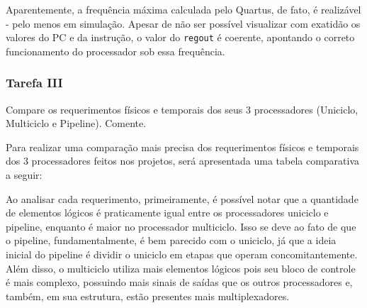 \documentclass[a4paper,12pt]{article}
\newcommand{\cod}[1]{\texttt{#1}}
\begin{document}
Aparentemente, a frequência máxima calculada pelo Quartus, de fato, é realizável - pelo menos em simulação. Apesar de não ser possível visualizar com exatidão os valores do PC e da instrução, o valor do \cod{regout} é coerente, apontando o correto funcionamento do processador sob essa frequência.

\subsubsection{Tarefa III}
\begin{tcolorbox}[title=Enunciado, colback=blue!5!white, colframe=blue!75!black]
    Compare os requerimentos físicos e temporais dos seus 3 processadores (Uniciclo, Multiciclo e Pipeline). Comente. 
\end{tcolorbox}

Para realizar uma comparação mais precisa dos requerimentos físicos e temporais dos 3 processadores feitos nos projetos, será apresentada uma tabela comparativa a seguir:

\begin{table}[h!]
\centering
{}
\end{table}

Ao analisar cada requerimento, primeiramente, é possível notar que a quantidade de elementos lógicos é praticamente igual entre os processadores uniciclo e pipeline, enquanto é maior no processador multiciclo. Isso se deve ao fato de que o pipeline, fundamentalmente, é bem parecido com o uniciclo, já que a ideia inicial do pipeline é dividir o uniciclo em etapas que operam concomitantemente. Além disso, o multiciclo utiliza mais elementos lógicos pois seu bloco de controle é mais complexo, possuindo mais sinais de saídas que os outros processadores e, também, em sua estrutura, estão presentes mais multiplexadores.
\end{document}
